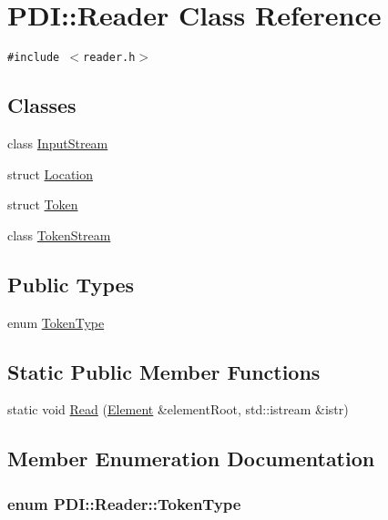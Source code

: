 \hypertarget{class_p_d_i_1_1_reader}{
\section{PDI::Reader Class Reference}
\label{class_p_d_i_1_1_reader}
}
{\tt \#include $<$reader.h$>$}

\subsection*{Classes}
\begin{CompactItemize}
\item 
class \hyperlink{class_p_d_i_1_1_reader_1_1_input_stream}{InputStream}
\item 
struct \hyperlink{struct_p_d_i_1_1_reader_1_1_location}{Location}
\item 
struct \hyperlink{struct_p_d_i_1_1_reader_1_1_token}{Token}
\item 
class \hyperlink{class_p_d_i_1_1_reader_1_1_token_stream}{TokenStream}
\end{CompactItemize}
\subsection*{Public Types}
\begin{CompactItemize}
\item 
enum \hyperlink{class_p_d_i_1_1_reader_1763e50e90708afa61cd3b69979772e9}{TokenType} 
\end{CompactItemize}
\subsection*{Static Public Member Functions}
\begin{CompactItemize}
\item 
static void \hyperlink{class_p_d_i_1_1_reader_f4bd913b90e3e0c8e7c0b38579a0f357}{Read} (\hyperlink{class_p_d_i_1_1_element}{Element} \&elementRoot, std::istream \&istr)
\end{CompactItemize}


\subsection{Member Enumeration Documentation}
\hypertarget{class_p_d_i_1_1_reader_1763e50e90708afa61cd3b69979772e9}{
\subsubsection[{TokenType}]{\setlength{\rightskip}{0pt plus 5cm}enum {\bf PDI::Reader::TokenType}}}
\label{class_p_d_i_1_1_reader_1763e50e90708afa61cd3b69979772e9}




